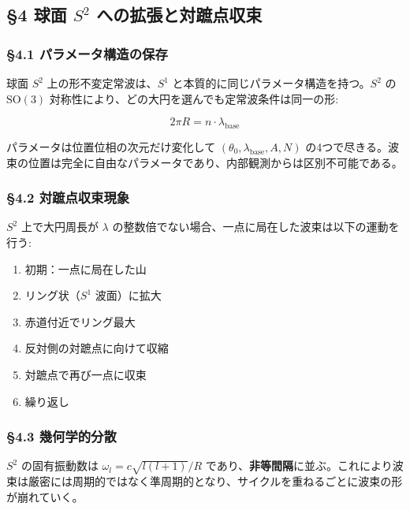 \documentclass[
  a4paper,11pt]{ltjsarticle}
\providecommand{\tightlist}{%
  \setlength{\itemsep}{0pt}\setlength{\parskip}{0pt}}
\theoremstyle{definition}
\theoremstyle{remark}
\begin{document}
\subsection{\texorpdfstring{§4 球面 \(S^2\)
への拡張と対蹠点収束}{§4 球面 S\^{}2 への拡張と対蹠点収束}}\label{ux7403ux9762-s2-ux3078ux306eux62e1ux5f35ux3068ux5bfeux8e60ux70b9ux53ceux675f}

\subsubsection{§4.1
パラメータ構造の保存}\label{ux30d1ux30e9ux30e1ux30fcux30bfux69cbux9020ux306eux4fddux5b58}

球面 \(S^2\) 上の形不変定常波は、\(S^1\)
と本質的に同じパラメータ構造を持つ。\(S^2\) の \(\mathrm{SO}(3)\)
対称性により、どの大円を選んでも定常波条件は同一の形:

\[2\pi R = n \cdot \lambda_{\text{base}}\]

パラメータは位置位相の次元だけ変化して
\((\theta_0, \lambda_{\text{base}}, A, N)\)
の4つで尽きる。波束の位置は完全に自由なパラメータであり、内部観測からは区別不可能である。

\subsubsection{§4.2
対蹠点収束現象}\label{ux5bfeux8e60ux70b9ux53ceux675fux73feux8c61}

\(S^2\) 上で大円周長が \(\lambda\)
の整数倍でない場合、一点に局在した波束は以下の運動を行う:

\begin{enumerate}
\def\labelenumi{\arabic{enumi}.}
\tightlist
\item
  初期：一点に局在した山
\item
  リング状（\(S^1\) 波面）に拡大
\item
  赤道付近でリング最大
\item
  反対側の対蹠点に向けて収縮
\item
  対蹠点で再び一点に収束
\item
  繰り返し
\end{enumerate}

\subsubsection{§4.3
幾何学的分散}\label{ux5e7eux4f55ux5b66ux7684ux5206ux6563}

\(S^2\) の固有振動数は \(\omega_l = c\sqrt{l(l+1)}/R\)
であり、\textbf{非等間隔}に並ぶ。これにより波束は厳密には周期的ではなく準周期的となり、サイクルを重ねるごとに波束の形が崩れていく。
\end{document}
